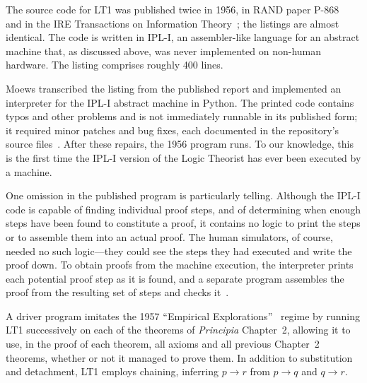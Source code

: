 \documentclass[journal]{IEEEtran}
\begin{document}
The source code for LT1 was published twice in 1956, in RAND paper
P-868~\cite{LT1956a} and in the IRE Transactions on Information
Theory~\cite{LT1956b}; the listings are almost identical. The code is
written in IPL-I, an assembler-like language for an abstract machine
that, as discussed above, was never implemented on non-human
hardware. The listing comprises roughly 400 lines.

Moews transcribed the listing from the published report and
implemented an interpreter for the IPL-I abstract machine in Python.
The printed code contains typos and other problems and is not
immediately runnable in its published form; it required minor patches
and bug fixes, each documented in the repository's source
files~\cite{moewsrepo}. After these repairs, the 1956 program runs.
To our knowledge, this is the first time the IPL-I version of the
Logic Theorist has ever been executed by a machine.

One omission in the published program is particularly telling.
Although the IPL-I code is capable of finding individual proof steps,
and of determining when enough steps have been found to constitute a
proof, it contains no logic to print the steps or to assemble them
into an actual proof. The human simulators, of course, needed no such
logic---they could see the steps they had executed and write the proof
down. To obtain proofs from the machine execution, the interpreter
prints each potential proof step as it is found, and a separate
program assembles the proof from the resulting set of steps and checks
it~\cite{moewsrepo}.

A driver program imitates the 1957 ``Empirical
Explorations''~\cite{LT1957} regime by running LT1 successively on
each of the theorems of \textit{Principia} Chapter~2, allowing it to
use, in the proof of each theorem, all axioms and all previous
Chapter~2 theorems, whether or not it managed to prove them. In
addition to substitution and detachment, LT1 employs chaining,
inferring $p \rightarrow r$ from $p \rightarrow q$ and $q \rightarrow
r$.

\end{document}
